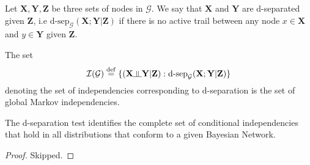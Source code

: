 \begin{defn}[d-separation]
Let $\mathbf X, \mathbf Y, \mathbf Z$ be three sets of nodes in $\mathcal G$. We say that $\mathbf X$ and $\mathbf Y$ are d-separated given $\mathbf Z$, i.e $\text{d-sep}_\mathcal{G}(\mathbf X; \mathbf Y|\mathbf Z)$ if there is no active trail between any node $x \in \mathbf X$ and $y \in \mathbf Y$ given $\mathbf Z$.
\end{defn}
\begin{defn}
The set 
\begin{equation}
\mathcal{I(G)} \overset{\mathrm{def}}{=} \{(\mathbf X \ind \mathbf Y | \mathbf Z): \text{d-sep}_\mathcal{G}(\mathbf X; \mathbf Y | \mathbf Z)\}
\end{equation}
denoting the set of independencies corresponding to d-separation is the set of global Markov independencies. 
\end{defn}
\begin{thm}\label{thm:global-markov-ind}
The d-separation test identifies the complete set of conditional independencies that hold in all distributions that conform to a given Bayesian Network.
\end{thm}
\begin{proof}
Skipped.
\end{proof}

